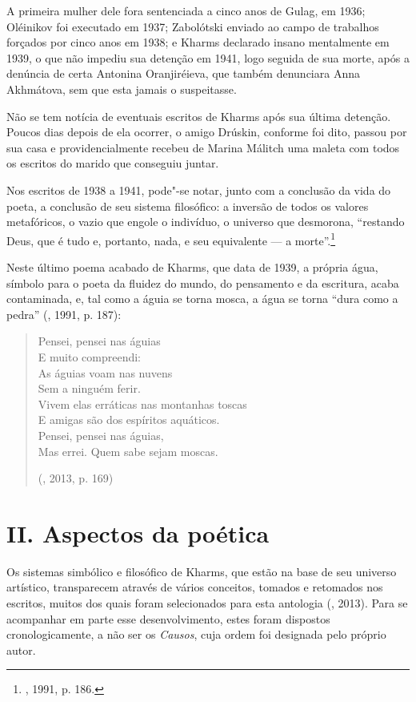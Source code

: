 A primeira mulher dele fora sentenciada a cinco anos de Gulag,
em 1936; Oléinikov foi executado em 1937; Zabolótski enviado ao
campo de trabalhos forçados por cinco anos em 1938; e Kharms
declarado insano mentalmente em 1939, o que não impediu sua
detenção em 1941, logo seguida de sua morte, após a denúncia
de certa Antonina Oranjiréieva, que também denunciara Anna
Akhmátova, sem que esta jamais o suspeitasse.

Não se tem notícia de eventuais escritos de Kharms após sua
última detenção. Poucos dias depois de ela ocorrer, o amigo
Drúskin, conforme foi dito, passou por sua casa e
providencialmente recebeu de Marina Málitch uma maleta com
todos os escritos do marido que conseguiu juntar.

Nos escritos de 1938 a 1941, pode"-se notar, junto com a conclusão
da vida do poeta, a conclusão de seu sistema filosófico: a inversão
de todos os valores metafóricos, o vazio que engole o indivíduo, o
universo que desmorona, ``restando Deus, que é tudo e, portanto,
nada, e seu equivalente --- a morte''.\footnote{,
1991, p. 186.}

Neste último poema acabado de Kharms, que data de 1939, a própria
água, símbolo para o poeta da fluidez do mundo, do pensamento e da
escritura, acaba contaminada, e, tal como a águia se torna mosca,
a água se torna ``dura como a pedra'' (, 1991, p.
187): 

\begin{verse}
Pensei, pensei nas águias \\
E muito compreendi: \\
As águias voam nas nuvens \\
Sem a ninguém ferir. \\
Vivem elas erráticas nas montanhas toscas \\
E amigas são dos espíritos aquáticos. \\
Pensei, pensei nas águias, \\
Mas errei. Quem sabe sejam moscas.

(, 2013, p. 169)

\end{verse}

\section{\uppercase{II}. \uppercase{A}spectos da poética}

Os sistemas simbólico e filosófico de Kharms, que estão na base de seu
universo artístico, transparecem através de
vários conceitos, tomados e retomados nos escritos, muitos dos quais foram selecionados
 para esta antologia (, 2013). Para se acompanhar em
 parte esse desenvolvimento, estes foram dispostos cronologicamente,
 a não ser os \emph{Causos}, cuja ordem foi designada pelo próprio
 autor.

